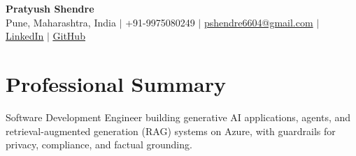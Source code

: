 \documentclass[a4paper,11pt]{article}
\begin{document}
\begin{center}
  {\Large\bfseries Pratyush Shendre}\\[2pt]
  \small Pune, Maharashtra, India $|$ +91-9975080249 $|$
  \href{mailto:pshendre6604@gmail.com}{pshendre6604@gmail.com} $|$
  \href{https://www.linkedin.com/in/pratyush-shendre-2256a7223/}{\underline{LinkedIn}} $|$
  \href{https://github.com/PratyushS04}{\underline{GitHub}}
\end{center}

\section{Professional Summary}
\small Software Development Engineer building generative AI applications, agents, and retrieval-augmented generation (RAG) systems on Azure, with guardrails for privacy, compliance, and factual grounding.
\end{document}
